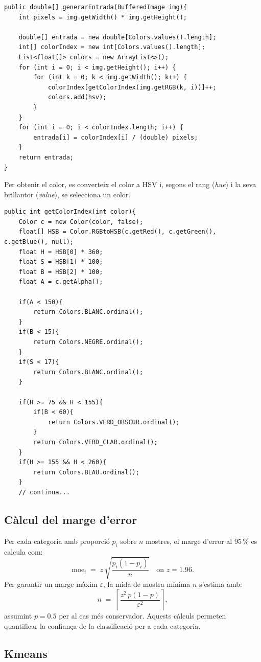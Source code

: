 \documentclass{ieeetj}
\begin{document}
\begin{lstlisting}
public double[] generarEntrada(BufferedImage img){
    int pixels = img.getWidth() * img.getHeight();

    double[] entrada = new double[Colors.values().length];
    int[] colorIndex = new int[Colors.values().length];
    List<float[]> colors = new ArrayList<>();
    for (int i = 0; i < img.getHeight(); i++) {
        for (int k = 0; k < img.getWidth(); k++) {
            colorIndex[getColorIndex(img.getRGB(k, i))]++;
            colors.add(hsv);
        }
    }
    for (int i = 0; i < colorIndex.length; i++) {
        entrada[i] = colorIndex[i] / (double) pixels;
    }
    return entrada;
}
\end{lstlisting}
Per obtenir el color, es converteix el color a HSV i, segons el rang (\textit{hue}) i la seva brillantor (\textit{value}), se selecciona un color.
\begin{lstlisting}
public int getColorIndex(int color){
    Color c = new Color(color, false);
    float[] HSB = Color.RGBtoHSB(c.getRed(), c.getGreen(), c.getBlue(), null);
    float H = HSB[0] * 360;
    float S = HSB[1] * 100;
    float B = HSB[2] * 100;
    float A = c.getAlpha();

    if(A < 150){
        return Colors.BLANC.ordinal();
    }
    if(B < 15){
        return Colors.NEGRE.ordinal();
    }
    if(S < 17){
        return Colors.BLANC.ordinal();
    }

    if(H >= 75 && H < 155){
        if(B < 60){
            return Colors.VERD_OBSCUR.ordinal();
        }
        return Colors.VERD_CLAR.ordinal();
    }
    if(H >= 155 && H < 260){
        return Colors.BLAU.ordinal();
    }
    // continua...
\end{lstlisting}
\subsection{Càlcul del marge d’error}
Per cada categoria amb proporció $p_i$ sobre $n$ mostres, el marge d’error al 95\,\% es calcula com:
\[
  \mathrm{moe}_i \;=\; z \,\sqrt{\frac{p_i(1-p_i)}{n}}
  \quad\text{on }z = 1.96.
\]
Per garantir un marge màxim $\varepsilon$, la mida de mostra mínima $n$ s’estima amb:
\[
  n \;=\;\left\lceil \frac{z^2\,p(1-p)}{\varepsilon^2} \right\rceil,
\]
assumint $p=0.5$ per al cas més conservador. Aquests càlculs permeten quantificar la confiança de la classificació per a cada categoria.
\subsection{Kmeans}
\end{document}
